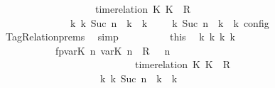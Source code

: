 \begin{isabellebody}
\ \ \ \ \ \ \ \ \ \ \ \ \ \ \ \ {\isasymturnstile}\ {\isasymPsi}\ {\isasymtriangleright}\ {\isacharparenleft}{\isacharparenleft}time{\isacharminus}relation\ {\isasymlfloor}K\ K\ {\isasymin}\ R{\isacharparenright}\ {\isacharhash}\ {\isasymPhi}{\isacharparenright}{\isacharparenright}\isanewline
\ \ \ \ \ \ \ \ \ \ \ \ \ \ {\isasymhookrightarrow}\isactrlbsup k\isactrlesup \ {\isacharparenleft}{\isasymGamma}\isactrlsub k{\isacharcomma}\ Suc\ n\ {\isasymturnstile}\ {\isasymPsi}\isactrlsub k\ {\isasymtriangleright}\ {\isasymPhi}\isactrlsub k{\isacharparenright}{\isacharparenright}\ {\isasymand}\ {\isasymrho}\ {\isasymin}\ {\isasymlbrakk}\ {\isasymGamma}\isactrlsub k{\isacharcomma}\ Suc\ n\ {\isasymturnstile}\ {\isasymPsi}\isactrlsub k\ {\isasymtriangleright}\ {\isasymPhi}\isactrlsub k\ {\isasymrbrakk}\isactrlsub c\isactrlsub o\isactrlsub n\isactrlsub f\isactrlsub i\isactrlsub g{\isacartoucheclose}\isanewline
\ \ \ \ \ \ \ \ \ \ \isamarkupfalse%
\ TagRelation{\isachardot}prems\ \isamarkupfalse%
\ simp\isanewline
\isanewline
\ \ \ \ \ \ \ \ \isamarkupfalse%
\ this\ \isamarkupfalse%
\ {\isasymGamma}\isactrlsub k\ {\isasymPsi}\isactrlsub k\ {\isasymPhi}\isactrlsub k\ k\isanewline
\ \ \ \ \ \ \ \ \ \ \ fp{\isacharcolon}{\isacartoucheopen}{\isacharparenleft}{\isacharparenleft}{\isacharparenleft}{\isacharparenleft}{\isasymlfloor}{\isasymtau}\isactrlsub v\isactrlsub a\isactrlsub r{\isacharparenleft}K\ n{\isacharparenright}{\isacharcomma}\ {\isasymtau}\isactrlsub v\isactrlsub a\isactrlsub r{\isacharparenleft}K\ n{\isacharparenright}{\isasymrfloor}\ {\isasymin}\ R{\isacharparenright}\ {\isacharhash}\ {\isasymGamma}{\isacharparenright}{\isacharcomma}\ n\isanewline
\ \ \ \ \ \ \ \ \ \ \ \ \ \ \ \ \ \ \ \ \ \ \ \ {\isasymturnstile}\ {\isasymPsi}\ {\isasymtriangleright}\ {\isacharparenleft}{\isacharparenleft}time{\isacharminus}relation\ {\isasymlfloor}K\ K\ {\isasymin}\ R{\isacharparenright}\ {\isacharhash}\ {\isasymPhi}{\isacharparenright}{\isacharparenright}\isanewline
\ \ \ \ \ \ \ \ \ \ \ \ \ \ \ \ \ \ \ \ {\isasymhookrightarrow}\isactrlbsup k\isactrlesup \ {\isacharparenleft}{\isasymGamma}\isactrlsub k{\isacharcomma}\ Suc\ n\ {\isasymturnstile}\ {\isasymPsi}\isactrlsub k\ {\isasymtriangleright}\ {\isasymPhi}\isactrlsub k{\isacharparenright}{\isacharparenright}{\isacartoucheclose}\isanewline

\end{isabellebody}
